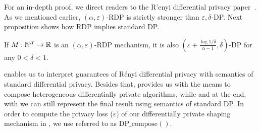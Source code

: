 \noindent For an in-depth proof, we direct readers to the R'enyi differential privacy paper~\cite{mironov2017renyi}.
As we mentioned earlier, $(\alpha, \varepsilon)$-RDP is strictly stronger than $\varepsilon, \delta$-DP. 
Next proposition shows how RDP implies standard DP.
\begin{proposition}\label{prop:rdp-better-than-dp}
  If $M: \mathbb{N}^\mathcal{X} \rightarrow \mathbb{R}$ is an $(\alpha, \varepsilon)$-RDP mechanism, it is also $(\varepsilon + \frac{\log 1/\delta}{\alpha-1}, \delta)$-DP for any $0 < \delta < 1$. 
\end{proposition}
\noindent {} enables us to interpret guarantees of R\'enyi differential privacy with semantics of standard differential privacy. 
Besides that,  provides us with the means to compose heterogeneous differentially private algorithms, while and at the end, with  we can still represent the final result using semantics of standard DP. 
In order to compute the privacy loss (\ie $\varepsilon$) of our differentially private shaping mechanism in , we use  referred to as $\textrm{DP\_compose}()$.